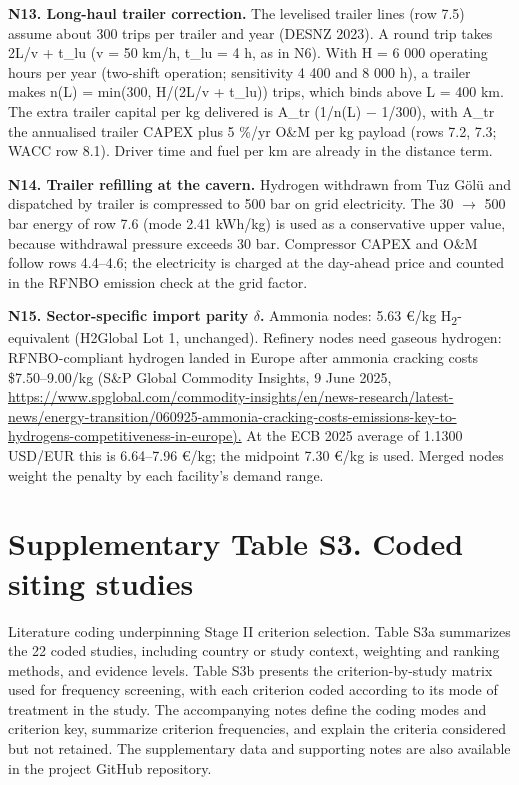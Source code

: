 \documentclass[11pt,a4paper]{article}
\begin{document}
\textbf{N13. Long-haul trailer correction.} The levelised trailer lines (row 7.5) assume about 300 trips per trailer and year (DESNZ 2023). A round trip takes 2L/v + t\_lu (v = 50 km/h, t\_lu = 4 h, as in N6). With H = 6 000 operating hours per year (two-shift operation; sensitivity 4 400 and 8 000 h), a trailer makes n(L) = min(300, H/(2L/v + t\_lu)) trips, which binds above L = 400 km. The extra trailer capital per kg delivered is A\_tr (1/n(L) $-$ 1/300), with A\_tr the annualised trailer CAPEX plus 5 \%/yr O\&M per kg payload (rows 7.2, 7.3; WACC row 8.1). Driver time and fuel per km are already in the distance term.

\textbf{N14. Trailer refilling at the cavern.} Hydrogen withdrawn from Tuz Gölü and dispatched by trailer is compressed to 500 bar on grid electricity. The 30 $\rightarrow$ 500 bar energy of row 7.6 (mode 2.41 kWh/kg) is used as a conservative upper value, because withdrawal pressure exceeds 30 bar. Compressor CAPEX and O\&M follow rows 4.4--4.6; the electricity is charged at the day-ahead price and counted in the RFNBO emission check at the grid factor.

\textbf{N15. Sector-specific import parity $\delta$.} Ammonia nodes: 5.63 \euro{}/kg H\textsubscript{2}-equivalent (H2Global Lot 1, unchanged). Refinery nodes need gaseous hydrogen: RFNBO-compliant hydrogen landed in Europe after ammonia cracking costs \$7.50--9.00/kg (S\&P Global Commodity Insights, 9 June 2025, \url{https://www.spglobal.com/commodity-insights/en/news-research/latest-news/energy-transition/060925-ammonia-cracking-costs-emissions-key-to-hydrogens-competitiveness-in-europe).} At the ECB 2025 average of 1.1300 USD/EUR this is 6.64--7.96 \euro{}/kg; the midpoint 7.30 \euro{}/kg is used. Merged nodes weight the penalty by each facility's demand range.

\newpage\section{Supplementary Table S3. Coded siting studies}

Literature coding underpinning Stage II criterion selection. Table S3a summarizes the 22 coded studies, including country or study context, weighting and ranking methods, and evidence levels. Table S3b presents the criterion-by-study matrix used for frequency screening, with each criterion coded according to its mode of treatment in the study. The accompanying notes define the coding modes and criterion key, summarize criterion frequencies, and explain the criteria considered but not retained. The supplementary data and supporting notes are also available in the project GitHub repository.
\end{document}

